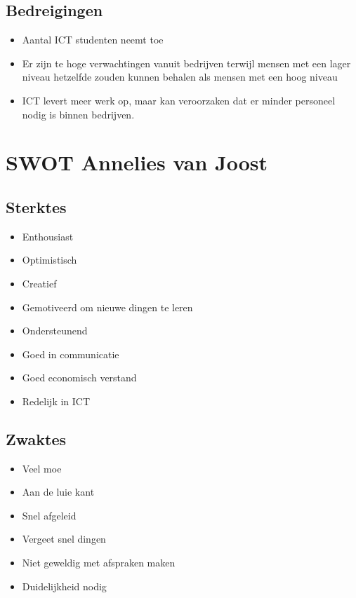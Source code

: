 \documentclass[11pt,oneside,a4paper,numbers=enddot]{report} %
\begin{document}
\subsection{Bedreigingen}

\begin{itemize}
\item
  Aantal ICT studenten neemt toe
\item
  Er zijn te hoge verwachtingen vanuit bedrijven
  terwijl mensen met een lager niveau hetzelfde zouden kunnen behalen
  als mensen met een hoog niveau
\item
  ICT levert meer werk op,
  maar kan veroorzaken dat er minder personeel nodig is binnen bedrijven.
\end{itemize}

\section{SWOT Annelies van Joost}

\subsection{Sterktes}
\begin{itemize}
\item Enthousiast
\item Optimistisch
\item Creatief
\item Gemotiveerd om nieuwe dingen te leren
\item Ondersteunend
\item Goed in communicatie
\item Goed economisch verstand
\item Redelijk in ICT
\end{itemize}

\subsection{Zwaktes}
\begin{itemize}  
\item Veel moe
\item Aan de luie kant
\item Snel afgeleid
\item Vergeet snel dingen
\item Niet geweldig met afspraken maken
\item Duidelijkheid nodig
\end{itemize}
\end{document}
